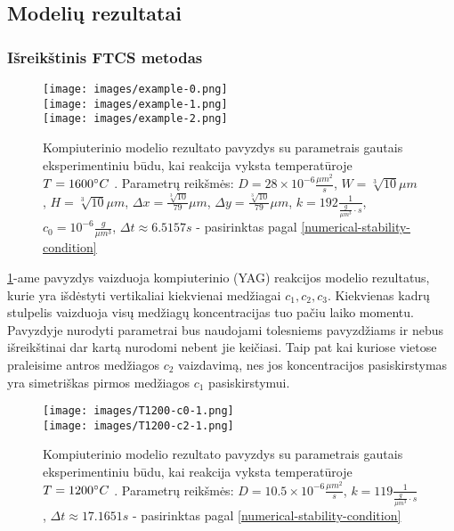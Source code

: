 \newpage
\subsection{Modelių rezultatai}

\subsubsection{Išreikštinis FTCS metodas}

\begin{figure}[h!]
\centering
\texttt{[image: images/example-0.png]} \\ 
\texttt{[image: images/example-1.png]} \\
\texttt{[image: images/example-2.png]}

\caption{Kompiuterinio modelio rezultato pavyzdys su parametrais gautais eksperimentiniu būdu, kai reakcija vyksta temperatūroje $T=1600\degree C$ \cite{mackeviciusCloserLookComputer2012}. Parametrų reikšmės: $D = 28\times 10^{-6} \frac{\mu m^2}{s}$, $W = \sqrt[3]{10}\mu m$, $H = \sqrt[3]{10}\mu m$, $\Delta x = \frac{\sqrt[3]{10}}{79}\mu m$, $\Delta y = \frac{\sqrt[3]{10}}{79} \mu m$, $k = 192 \frac{1}{ \frac{g}{\mu m^3}\cdot s}$, $c_0 = 10^{-6} \frac{g}{\mu m^3}$, $\Delta t \approx 6.5157s$ - pasirinktas pagal \eqref{numerical-stability-condition} }

\label{result-example}
\end{figure}

\ref{result-example}-ame pavyzdys vaizduoja kompiuterinio (YAG) reakcijos modelio rezultatus, kurie yra išdėstyti vertikaliai kiekvienai medžiagai $c_1, c_2, c_3$. Kiekvienas kadrų stulpelis vaizduoja visų medžiagų koncentracijas tuo pačiu laiko momentu. Pavyzdyje nurodyti parametrai bus naudojami tolesniems pavyzdžiams ir nebus išreikštinai dar kartą nurodomi nebent jie keičiasi. Taip pat kai kuriose vietose praleisime antros medžiagos $c_2$ vaizdavimą, nes jos koncentracijos pasiskirstymas yra simetriškas pirmos medžiagos $c_1$ pasiskirstymui.

\newpage

\begin{figure}[h!]
\centering
\texttt{[image: images/T1200-c0-1.png]} \\ 
\texttt{[image: images/T1200-c2-1.png]} 

\caption{Kompiuterinio modelio rezultato pavyzdys su parametrais gautais eksperimentiniu būdu, kai reakcija vyksta temperatūroje $T=1200\degree C$ \cite{mackeviciusCloserLookComputer2012}. Parametrų reikšmės: $D = 10.5\times 10^{-6} \frac{\mu m^2}{s}$, $k = 119 \frac{1}{ \frac{g}{\mu m^3}\cdot s}$, $\Delta t \approx 17.1651s$ - pasirinktas pagal \eqref{numerical-stability-condition} }

\label{alternate-result-example}
\end{figure}

